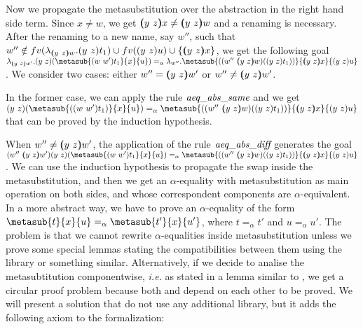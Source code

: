 \begin{coqdoccode}
\end{coqdoccode}
Now we propagate the metasubstitution over the abstraction in the right hand side term. Since $x\neq w$, we get $\vswap{y}{z}{x} \neq \vswap{y}{z}{w}$ and a renaming is necessary. After the renaming to a new name, say $w''$, such that $w'' \notin fv(\lambda_{\vswap{y}{z}{w}}.\swap{y}{z}{t_1}) \cup fv(\swap{y}{z}{u}) \cup \{\vswap{y}{z}{x}\}$, we get the following goal $\lambda_{\vswap{y}{z}{w'}}.\swap{y}{z}{(\metasub{\swap{w}{w'}{t_1}}{x}{u})} =_\alpha \lambda_{w''}.\metasub{(\swap{w''}{\vswap{y}{z}{w}}{(\swap{y}{z}{t_1})})}{\vswap{y}{z}{x}}{\swap{y}{z}{u}}$. We consider two cases: either $w'' = (\!\!(y\ z)\!\!) w'$ or $w'' \neq (\!\!(y\ z)\!\!) w'$.
\begin{coqdoccode}
\end{coqdoccode}
In the former case, we can apply the rule $\mbox{\it aeq}\_\mbox{\it abs}\_\mbox{\it same}$ and we get $\swap{y}{z}{(\metasub{(\swap{w}{w'}{t_1})}{x}{u})} =_\alpha \metasub{(\swap{w''}{\vswap{y}{z}{w}}{(\swap{y}{z}{t_1})})}{\vswap{y}{z}{x}}{\swap{y}{z}{u}}$ that can be proved by the induction hypothesis.
\begin{coqdoccode}
\end{coqdoccode}
When $w'' \neq (\!\!(y\ z)\!\!) w'$, the application of the rule $\mbox{\it aeq}\_\mbox{\it abs}\_\mbox{\it diff}$ generates the goal $\swap{w''}{\vswap{y}{z}{w'}}{\swap{y}{z}{(\metasub{\swap{w}{w'}{t_1}}{x}{u})}} =_\alpha \metasub{(\swap{w''}{\vswap{y}{z}{w}}{(\swap{y}{z}{t_1})})}{\vswap{y}{z}{x}}{\swap{y}{z}{u}}$. We can use the induction hypothesis to propagate the swap inside the metasubstitution, and then we get an $\alpha$-equality with metasubstitution as main operation on both sides, and whose correspondent components are $\alpha$-equivalent. In a more abstract way, we have to prove an $\alpha$-equality of the form $\metasub{t}{x}{u} =_\alpha \metasub{t'}{x}{u'}$, where $t =_\alpha t'$ and $u =_\alpha u'$. The problem is that we cannot rewrite $\alpha$-equalities inside metasubstitution unless we prove some special lemmas stating the compatibilities between them using the  library or something similar. Alternatively, if we decide to analise the metasubtitution componentwise, {\it i.e.} as stated in a lemma similar to , we get a circular proof problem because both  and  depend on each other to be proved. We will present a solution that do not use any additional library, but it adds the following axiom to the formalization:
